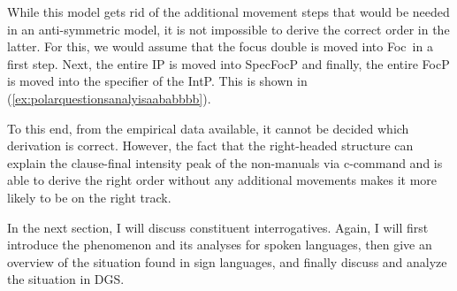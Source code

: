 \largerpage[2]
\noindent While this model gets rid of the additional movement steps that would be needed in an anti-symmetric model, it is not impossible to derive the correct order in the latter. For this, we would assume that the focus double is moved into Foc\textdegree\ in a first step. Next, the entire IP is moved into SpecFocP and finally, the entire FocP is moved into the specifier of the IntP. This is shown in (\ref{ex:polarquestionsanalyisaababbbb}).


\begin{exe}
\ex \label{ex:polarquestionsanalyisaababbbb}
\vspace*{-1cm}
\end{exe}


\newpage
\noindent To this end, from the empirical data available, it cannot be decided which derivation is correct. However, the fact that the right-headed structure can explain the clause-final intensity peak of the non-manuals via c-command and is able to derive the right order without any additional movements makes it more likely to be on the right track. %

In the next section, I will discuss constituent interrogatives. Again, I will first introduce the phenomenon and its analyses for spoken languages, then give an overview of the situation found in sign languages, and finally discuss and analyze the situation in DGS.



